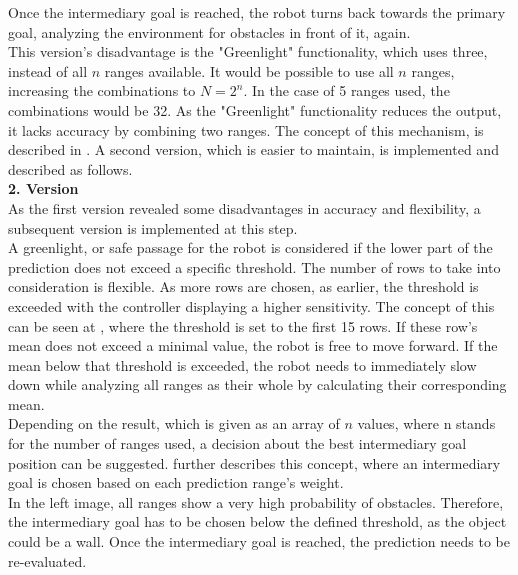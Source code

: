 Once the intermediary goal is reached, the robot turns back towards the primary goal, analyzing the environment for obstacles in front of it, again.\\

This version's disadvantage is the "Greenlight" functionality, which uses three, instead of all $n$ ranges available. It would be possible to use all $n$ ranges, increasing the combinations to $N = 2^n$. In the case of 5 ranges used, the combinations would be 32. As the "Greenlight" functionality reduces the output, it lacks accuracy by combining two ranges. The concept of this mechanism, is described in . A second version, which is easier to maintain, is implemented and described as follows.\\

\textbf{2. Version}\\
As the first version revealed some disadvantages in accuracy and flexibility, a subsequent version is implemented at this step.\\

A greenlight, or safe passage for the robot is considered if the lower part of the prediction does not exceed a specific threshold. The number of rows to take into consideration is flexible. As more rows are chosen, as earlier, the threshold is exceeded with the controller displaying a higher sensitivity. The concept of this can be seen at , where the threshold is set to the first 15 rows. If these row's mean does not exceed a minimal value, the robot is free to move forward. If the mean below that threshold is exceeded, the robot needs to immediately slow down while analyzing all ranges as their whole by calculating their corresponding mean.\\

Depending on the result, which is given as an array of $n$ values, where n stands for the number of ranges used, a decision about the best intermediary goal position can be suggested.  further describes this concept, where an intermediary goal is chosen based on each prediction range's weight.\\ 

In the left image, all ranges show a very high probability of obstacles. Therefore, the intermediary goal has to be chosen below the defined threshold, as the object could be a wall. Once the intermediary goal is reached, the prediction needs to be re-evaluated.\\

